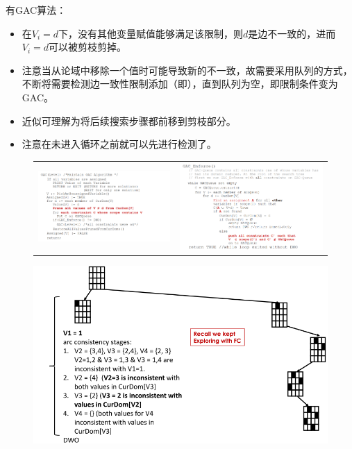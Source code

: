 有GAC算法：
\begin{itemize}
\item 在$V_i=d$下，没有其他变量赋值能够满足该限制，则$d$是边不一致的，进而$V_i=d$可以被剪枝剪掉。
\item 注意当从论域中移除一个值时可能导致新的不一致，故需要采用队列的方式，不断将需要检测边一致性限制添加（即），直到队列为空，即限制条件变为GAC。
\item 近似可理解为将后续搜索步骤都前移到剪枝部分。
\item 注意在未进入循环之前就可以先进行检测了。
\end{itemize}
\begin{figure}[H]
\centering
\begin{tabular}{cc}
\includegraphics[width=0.5\linewidth]{fig/gac.png}&
\includegraphics[width=0.5\linewidth]{fig/gac_enforce.png}
\end{tabular}
\end{figure}
\begin{figure}[H]
\centering
\includegraphics[width=0.6\linewidth]{fig/gac_eg.png}
\end{figure}

